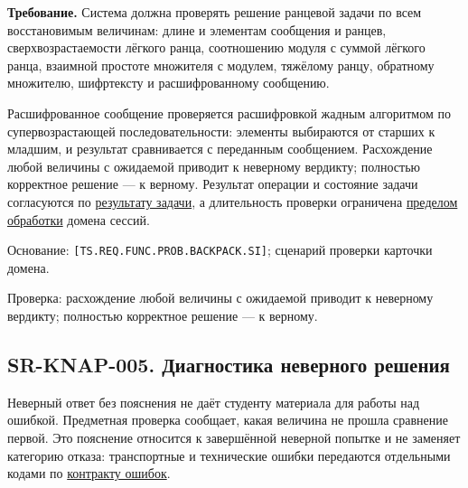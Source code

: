 \documentclass[12pt,a4paper]{article}
\begin{document}
\textbf{Требование.} Система должна проверять решение ранцевой задачи по всем восстановимым величинам: длине и элементам сообщения и ранцев, сверхвозрастаемости лёгкого ранца, соотношению модуля с суммой лёгкого ранца, взаимной простоте множителя с модулем, тяжёлому ранцу, обратному множителю, шифртексту и расшифрованному сообщению.

Расшифрованное сообщение проверяется расшифровкой жадным алгоритмом по супервозрастающей последовательности: элементы выбираются от старших к младшим, и результат сравнивается с переданным сообщением. Расхождение любой величины с ожидаемой приводит к неверному вердикту; полностью корректное решение --- к верному. Результат операции и состояние задачи согласуются по \hyperref[sr-ses-005-ux440ux435ux437ux443ux43bux44cux442ux430ux442-ux437ux430ux434ux430ux447ux438]{результату задачи}, а длительность проверки ограничена \hyperref[sr-ses-012-ux43eux433ux440ux430ux43dux438ux447ux435ux43dux43dux430ux44f-ux434ux43bux438ux442ux435ux43bux44cux43dux43eux441ux442ux44c-ux43eux431ux440ux430ux431ux43eux442ux43aux438]{пределом обработки} домена сессий.

Основание: \texttt{[TS.\allowbreak{}REQ.\allowbreak{}FUNC.\allowbreak{}PROB.\allowbreak{}BACKPACK.\allowbreak{}SI]}; сценарий проверки карточки домена.

Проверка: расхождение любой величины с ожидаемой приводит к неверному вердикту; полностью корректное решение --- к верному.

\subsection{SR-KNAP-005. Диагностика неверного решения}\label{sr-knap-005-ux434ux438ux430ux433ux43dux43eux441ux442ux438ux43aux430-ux43dux435ux432ux435ux440ux43dux43eux433ux43e-ux440ux435ux448ux435ux43dux438ux44f}

\hypertarget{sr-knap-005-диагностика-неверного-решения}{}

Неверный ответ без пояснения не даёт студенту материала для работы над ошибкой. Предметная проверка сообщает, какая величина не прошла сравнение первой. Это пояснение относится к завершённой неверной попытке и не заменяет категорию отказа: транспортные и технические ошибки передаются отдельными кодами по \href{../07_\%D0\%9F\%D1\%80\%D0\%BE\%D0\%B3\%D1\%80\%D0\%B0\%D0\%BC\%D0\%BC\%D0\%BD\%D1\%8B\%D0\%B5_\%D1\%82\%D1\%80\%D0\%B5\%D0\%B1\%D0\%BE\%D0\%B2\%D0\%B0\%D0\%BD\%D0\%B8\%D1\%8F/DOC-06.2_\%D0\%A1\%D0\%B5\%D1\%81\%D1\%81\%D0\%B8\%D0\%B8_\%D0\%B7\%D0\%B0\%D0\%B4\%D0\%B0\%D1\%87_\%D0\%B8_\%D0\%BF\%D0\%BB\%D0\%B0\%D0\%BD\%D0\%B8\%D1\%80\%D0\%BE\%D0\%B2\%D1\%89\%D0\%B8\%D0\%BA.pdf\#nameddest=\%D0\%BA\%D0\%BE\%D0\%B4\%D1\%8B-\%D0\%B8-\%D0\%BF\%D1\%80\%D0\%B5\%D0\%B4\%D1\%81\%D1\%82\%D0\%B0\%D0\%B2\%D0\%BB\%D0\%B5\%D0\%BD\%D0\%B8\%D0\%B5-\%D0\%BE\%D1\%88\%D0\%B8\%D0\%B1\%D0\%BE\%D0\%BA}{контракту ошибок}.
\end{document}
